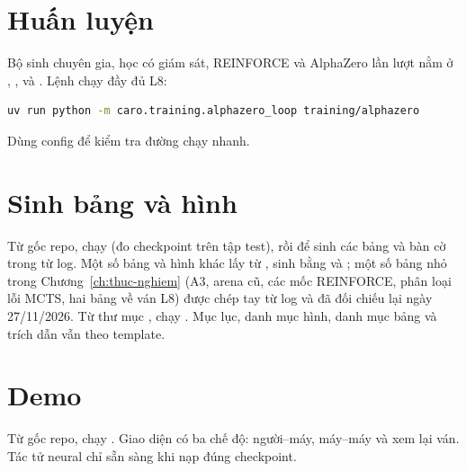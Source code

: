 \section{Huấn luyện}
Bộ sinh chuyên gia, học có giám sát, REINFORCE và AlphaZero lần lượt nằm ở
, ,
 và . Lệnh chạy đầy đủ L8:
\begin{lstlisting}[language=bash]
uv run python -m caro.training.alphazero_loop training/alphazero
\end{lstlisting}
Dùng config  để kiểm tra đường chạy nhanh.

\section{Sinh bảng và hình}
Từ gốc repo, chạy  (đo checkpoint trên tập test),
rồi  để sinh các bảng và bàn cờ trong
 từ log. Một số bảng và hình khác lấy từ , sinh bằng
 và ;
một số bảng nhỏ trong Chương~\ref{ch:thuc-nghiem} (A3, arena cũ, các mốc REINFORCE, phân loại lỗi MCTS, hai bảng về ván L8) được chép tay
từ log và đã đối chiếu lại ngày 27/11/2026. Từ thư mục , chạy
. Mục lục, danh mục hình, danh mục bảng và trích dẫn vẫn theo template.

\section{Demo}
Từ gốc repo, chạy . Giao diện có ba chế độ:
người--máy, máy--máy và xem lại ván. Tác tử neural chỉ sẵn sàng khi nạp đúng checkpoint.


